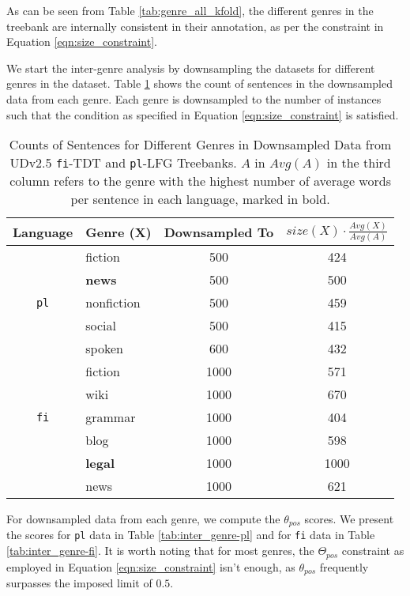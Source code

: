 As can be seen from Table \ref{tab:genre_all_kfold}, the different genres in the treebank are internally consistent in their annotation, as per the constraint in Equation \ref{eqn:size_constraint}.

We start the inter-genre analysis by downsampling the datasets for different genres in the dataset. Table \ref{tab:downsample_genre} shows the count of sentences in the downsampled data from each genre. Each genre is downsampled to the number of instances such that the condition as specified in Equation \ref{eqn:size_constraint} is satisfied.

\begin{table}[H]
    \centering
    \begin{tabular}{|c|l|c|c|}
        \hline
        \textbf{Language} & \textbf{Genre (X)} & \textbf{Downsampled To} & \textbf{$size(X) \cdot \frac{Avg(X)}{Avg(A)}$}\\
         \hline
         & fiction & 500 & 424 \\
         & \textbf{news} & 500 & 500 \\
        \texttt{pl} & nonfiction & 500 & 459 \\
         & social & 500 & 415 \\
         & spoken & 600 & 432 \\
        \hline
         & fiction & 1000 & 571 \\
         & wiki & 1000 & 670 \\
        \texttt{fi} & grammar & 1000 & 404 \\
         & blog & 1000 & 598 \\
         & \textbf{legal} & 1000 & 1000 \\
         & news & 1000 & 621 \\
        \hline
    \end{tabular}
    \caption[Counts of Sentences for Different Genres in Downsampled Data from UDv2.5 \texttt{fi}-TDT and \texttt{pl}-LFG Treebanks]{Counts of Sentences for Different Genres in Downsampled Data from UDv2.5 \texttt{fi}-TDT and \texttt{pl}-LFG Treebanks. $A$ in $Avg(A)$ in the third column refers to the genre with the highest number of average words per sentence in each language, marked in bold.}
    \label{tab:downsample_genre}
\end{table}

For downsampled data from each genre, we compute the $\theta_{pos}$ scores. We present the scores for \texttt{pl} data in Table \ref{tab:inter_genre-pl} and for \texttt{fi} data in Table \ref{tab:inter_genre-fi}. It is worth noting that for most genres, the $\Theta_{pos}$ constraint as employed in Equation \ref{eqn:size_constraint} isn't enough, as $\theta_{pos}$ frequently surpasses the imposed limit of $0.5$.

